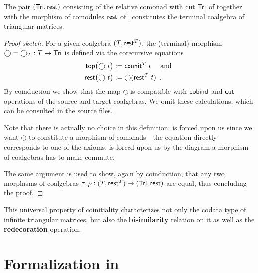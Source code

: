 \documentclass{amsart}
\newcommand{\fat}[1]{\textbf{#1}}
\begin{document}
\begin{theorem}\label{ex:final_sem_tri} %
   The pair $(\mathsf{Tri}, \mathsf{rest})$ consisting of the relative comonad with cut $\mathsf{Tri}$ of  together with 
    the morphism of comodules $\mathsf{rest}$ of ,
   constitutes the terminal coalgebra of triangular matrices.
\end{theorem}

\begin{proof}[Proof sketch]
   For a given coalgebra $(T,\mathsf{rest}^T)$, the (terminal) morphism $\bigcirc = \bigcirc_T:T\to\mathsf{Tri}$ is defined via the corecursive equations
    \begin{align}\mathsf{top}\bigl(\bigcirc~t\bigr) &:= \mathsf{counit}^T~t \quad\text{ and } \label{eq:terminal_top}\\
                     \mathsf{rest}\bigl(\bigcirc~t\bigr) &:= \bigcirc(\mathsf{rest}^T~t) \enspace . \label{eq:terminal_rest}
      \end{align}
      By coinduction we show that the map $\bigcirc$ is compatible with $\mathsf{cobind}$ and $\mathsf{cut}$ operations of the source and 
   target coalgebras. We omit these calculations, which can be consulted in the \coq source files.
   
   Note that there is actually no choice in this definition:  is forced upon us since we want $\bigcirc$ to constitute 
   a morphism of comonads---the equation directly corresponds to one of the axioms.
    is forced upon us by the diagram a morphism of coalgebras has to make commute.
   
   The same argument is used to show, again by coinduction, that any two morphisms of coalgebras $\tau,\rho : (T,\mathsf{rest}^T) \to (\mathsf{Tri},\mathsf{rest})$
   are equal, thus concluding the proof.   
\end{proof}

This universal property of coinitiality characterizes not only the codata type of infinite triangular matrices, but also
the \fat{bisimilarity} relation on it as well as the \fat{redecoration} operation.



\section{Formalization in \coq}\label{sec:formal}
\end{document}
